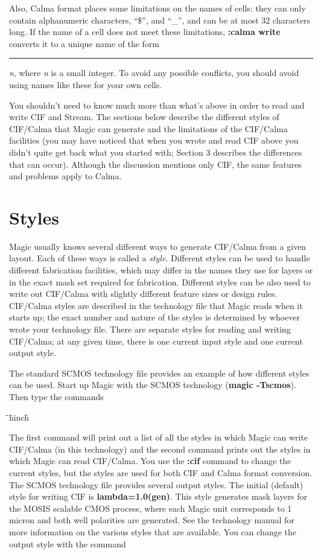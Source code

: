 \documentclass[letterpaper,twoside,12pt]{article}
\def\hinch{\hspace*{0.5in}}
\def\starti{\begin{center}\begin{tabbing}\hinch\=\hinch\=\hinch\=hinch\hinch\=\kill}
\def\endi{\end{tabbing}\end{center}}
\def\ii{\>\>\>}
\begin{document}
Also, Calma format places some limitations on the names of cells:
they can only contain alphanumeric characters, ``\$'', and ``{\_}'',
and can be at most 32 characters long.  If the name of a cell does
not meet these limitations, {\bfseries :calma write} converts it to a
unique name of the form \rule{0.25in}{0.5pt}{\itshape n}, where
{\itshape n} is a small
integer.  To avoid any possible conflicts, you should avoid using
names like these for your own cells.

You shouldn't need to know much more than what's above in order
to read and write CIF and Stream.  The sections below describe the different
styles of CIF/Calma that Magic can generate and the limitations
of the CIF/Calma facilities (you may have noticed that when you
wrote and read CIF above you didn't quite get back what you started
with;  Section 3 describes the differences that can occur).
Although the discussion mentions
only CIF, the same features and problems apply to Calma.

\section{Styles}

Magic usually knows several different ways to generate
CIF/Calma from a given layout.  Each of these ways is called a {\itshape style}.
Different styles can be used to handle different
fabrication facilities, which may differ in the names they use for
layers or in the exact mask set required for fabrication.
Different styles can be also used to write out CIF/Calma with slightly
different feature sizes or design rules.  CIF/Calma
styles are described in the technology file that Magic reads when
it starts up;  the exact number and nature of the styles is
determined by whoever wrote your technology file.  There are separate
styles for reading and writing CIF/Calma;  at any given time, there
is one current input style and one current output style.

The standard SCMOS technology file provides an example of how
different styles can be used.  Start up Magic with the
SCMOS technology ({\bfseries magic -Tscmos}).  Then type the commands

\starti
   \ii {\bfseries :cif ostyle} \\
   \ii {\bfseries :cif istyle}
\endi

The first command will print out a list of all the styles in
which Magic can write CIF/Calma (in this technology) and the second
command prints out the styles in which Magic can read CIF/Calma.
You use the {\bfseries :cif} command to change the current styles, but
the styles are used for both CIF and Calma format conversion.
The SCMOS technology file provides several output styles.
The initial (default) style for writing CIF is {\bfseries lambda=1.0(gen)}.
This style generates mask layers for the MOSIS scalable
CMOS process, where each Magic unit corresponds to 1 micron and
both well polarities are generated.  See the technology manual
for more information on the various styles that are available.
You can change the output style with the command
\end{document}
